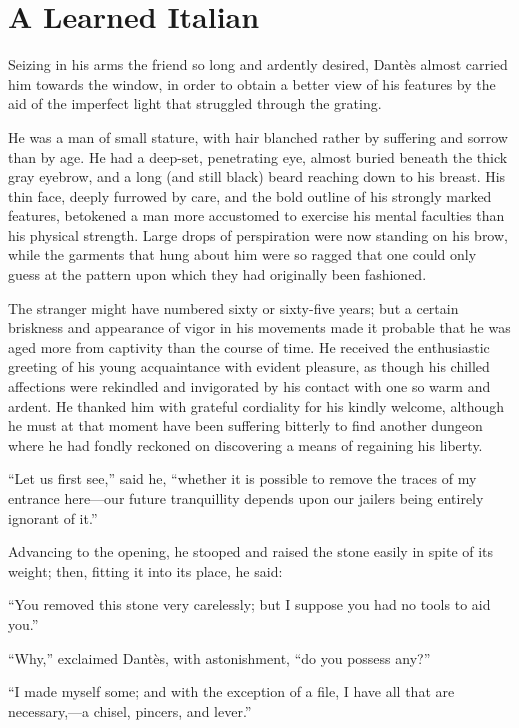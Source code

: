 \chapter{A Learned Italian}

Seizing in his arms the friend so long and ardently desired, Dantès
almost carried him towards the window, in order to obtain a better view
of his features by the aid of the imperfect light that struggled
through the grating.

He was a man of small stature, with hair blanched rather by suffering
and sorrow than by age. He had a deep-set, penetrating eye, almost
buried beneath the thick gray eyebrow, and a long (and still black)
beard reaching down to his breast. His thin face, deeply furrowed by
care, and the bold outline of his strongly marked features, betokened a
man more accustomed to exercise his mental faculties than his physical
strength. Large drops of perspiration were now standing on his brow,
while the garments that hung about him were so ragged that one could
only guess at the pattern upon which they had originally been
fashioned.

The stranger might have numbered sixty or sixty-five years; but a
certain briskness and appearance of vigor in his movements made it
probable that he was aged more from captivity than the course of time.
He received the enthusiastic greeting of his young acquaintance with
evident pleasure, as though his chilled affections were rekindled and
invigorated by his contact with one so warm and ardent. He thanked him
with grateful cordiality for his kindly welcome, although he must at
that moment have been suffering bitterly to find another dungeon where
he had fondly reckoned on discovering a means of regaining his liberty.

“Let us first see,” said he, “whether it is possible to remove the
traces of my entrance here—our future tranquillity depends upon our
jailers being entirely ignorant of it.”

Advancing to the opening, he stooped and raised the stone easily in
spite of its weight; then, fitting it into its place, he said:

“You removed this stone very carelessly; but I suppose you had no tools
to aid you.”

“Why,” exclaimed Dantès, with astonishment, “do you possess any?”

“I made myself some; and with the exception of a file, I have all that
are necessary,—a chisel, pincers, and lever.”

